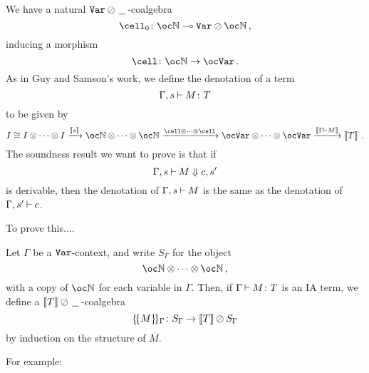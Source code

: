 \documentclass{article}
\newcommand{\sdeno}[1]{\{\!\{#1\}\!\}}
\begin{document}
We have a natural ${\mathtt{Var}}\oslash\,\underline{\hspace{1.5ex}}\,$-coalgebra
\[
  \cell_0\from \oc\bN \implies \Var \sequoid \oc\bN\,,
  \]
inducing a morphism
\[
  \cell \from \oc\bN \to \oc\Var\,.
  \]
As in Guy and Samson's work, we define the denotation of a term
\[
  \Gamma,s\mathbin{\vdash} M\colon T
  \]
to be given by
\[
  I \cong I \tensor \cdots \tensor I
  \xrightarrow{\deno{s}}
  \oc\bN \tensor \cdots \tensor \oc\bN
  \xrightarrow{\cell\tensor\cdots\tensor\cell}
  \oc\Var \tensor \cdots \tensor \oc\Var
  \xrightarrow{\deno{\Gamma\ts M}}
  \deno T\,.
  \]
The soundness result we want to prove is that if
\[
  \Gamma,s\mathbin{\vdash} M \Downarrow c,s'
  \]
is derivable, then the denotation of $\Gamma,s\mathbin{\vdash} M$ is the same as the denotation of $\Gamma,s'\mathbin{\vdash} c$.

To prove this....

Let $\Gamma$ be a ${\mathtt{Var}}$-context, and write $S_\Gamma$ for the object
\[
  \oc\bN \tensor \cdots \tensor \oc\bN\,,
  \]
with a copy of $\oc\bN$ for each variable in $\Gamma$.  
Then, if $\Gamma\mathbin{\vdash} M\colon T$ is an IA term, we define a $\left\llbracket T\right\rrbracket\oslash\,\underline{\hspace{1.5ex}}\,$-coalgebra
\[
  \sdeno{M}_\Gamma \from S_\Gamma \to \deno{T} \sequoid S_\Gamma
  \]
by induction on the structure of $M$.

For example:
\end{document}
